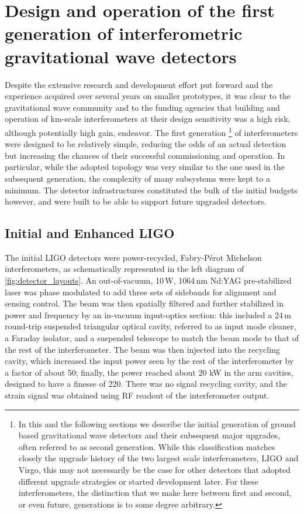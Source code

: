 \section{Design and operation of the first generation of interferometric gravitational wave detectors}\label{subsec:1stgen}

Despite the extensive research and development effort put forward and the experience acquired over several years on smaller prototypes, it was clear to the gravitational wave community and to the funding agencies that building and operation of km-scale interferometers at their design sensitivity was a high risk, although potentially high gain, endeavor.
The first generation
\footnote{In this and the following sections we describe the initial generation of ground based gravitational wave detectors and their subsequent major upgrades, often referred to as second generation. While this classification matches closely the upgrade history of the two largest scale interferometers, LIGO and Virgo, this may not necessarily be the case for other detectors that adopted different upgrade strategies or started development later. For these interferometers, the distinction that we make here between first and second, or even future, generations is to some degree arbitrary.
} 
of interferometers were designed to be relatively simple, reducing the odds of an actual detection but increasing the chances of their successful commissioning and operation.
In particular, while the adopted topology was very similar to the one used in the subsequent generation, the complexity of many subsystems were kept to a minimum.
The detector infrastructures constituted the bulk of the initial budgets however, and were built to be able to support future upgraded detectors.

\subsection{Initial and Enhanced LIGO}
The initial LIGO detectors\cite{Abbott_2004,Abbott_2009} were power-recycled, Fabry-P\'{e}rot Michelson interferometers, as schematically represented in the left diagram of \autoref{fig:detector_layouts}.
An out-of-vacuum, 10\,W, 1064\,nm Nd:YAG pre-stabilized laser was phase modulated to add three sets of sidebands for alignment and sensing control.
The beam was then spatially filtered and further stabilized in power and frequency by an in-vacuum input-optics section: this included a 24\,m round-trip suspended triangular optical cavity, referred to as input mode cleaner, a Faraday isolator, and a suspended telescope to match the beam mode to that of the rest of the interferometer.
The beam was then injected into the recycling cavity, which increased the input power seen by the rest of the interferometer by a factor of about 50; finally, the power reached about 20 kW in the arm cavities, designed to have a finesse of 220. There was no signal recycling cavity, and the strain signal was obtained using RF readout of the interferometer output.

